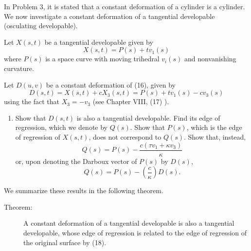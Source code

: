 \documentclass{book}
\begin{document}
In Problem 3, it is stated that a constant deformation of a cylinder is a cylinder. We now investigate a constant deformation of a tangential developable (osculating developable).

Let $X(s,t)$ be a tangential developable given by
\begin{equation}
X(s,t) = P(s) + tv_{1}(s)
\end{equation}
where $P(s)$ is a space curve with moving trihedral $v_{i}(s)$ and nonvanishing curvature. 

Let $D(u,v)$ be a constant deformation of (16), given by
\begin{equation}
D(s,t) = X(s,t) + cX_{3}(s,t) = P(s) + tv_{1} (s) - cv_{3}(s)
\end{equation}
using the fact that $X_{3} = - v_{3}$ (see Chapter VIII, (17) ).

\vspace{0.3cm}

\begin{enumerate}
  \item[14.] Show that $D(s,t)$ is also a tangential developable. Find its edge of regression, which we denote by $Q(s)$. Show that $P(s)$, which is the edge of regression of $X(s,t)$, does not correspond to $Q(s)$. Show that, instead,
    \begin{equation*}
      Q(s) = P(s) - \frac{ c(\tau v_{1} + \kappa v_{3}) }{ \kappa }
    \end{equation*}
    or, upon denoting the Darboux vector of $P(s)$ by $D(s)$,
    \begin{equation}
      Q(s) = P(s) - \left( \frac{c}{\kappa} \right) D(s).
    \end{equation}
\end{enumerate}

We summarize these results in the following theorem.

\begin{description}
\item[Theorem:] A constant deformation of a tangential developable is also a tangential developable, whose edge of regression is related to the edge of regression of the original surface by (18).
\end{description}
\end{document}
